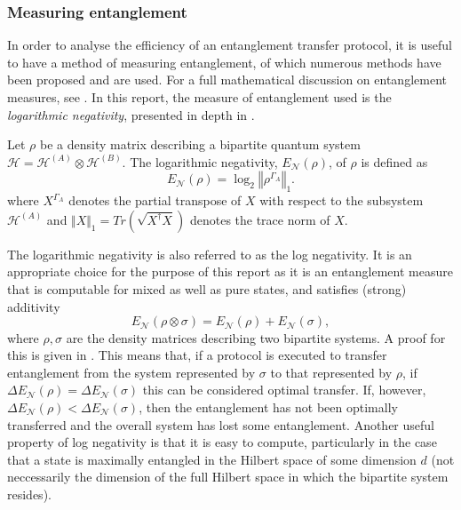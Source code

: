 \subsubsection{Measuring entanglement}
\label{subsubsection:measure_entanglement}
In order to analyse the efficiency of an entanglement transfer protocol, it is useful to have a method of measuring entanglement, of which numerous methods have been proposed and are used.
For a full mathematical discussion on entanglement measures, see \cite{Plenio_2007}.
In this report, the measure of entanglement used is the \emph{logarithmic negativity}, presented in depth in \cite{Vidal_2002}.
\begin{definition}
    \label{definition:log_neg}
    Let $\rho$ be a density matrix describing a bipartite quantum system $\mathcal{H} = \mathcal{H}^{(A)} \otimes \mathcal{H}^{(B)}$.
    The logarithmic negativity, $E_\mathcal{N}(\rho)$, of $\rho$ is defined as
    \begin{equation}
        E_\mathcal{N}(\rho) = \log_2\left\Vert \rho^{\Gamma_A}\right\Vert_1.
    \end{equation}
    where $X^{\Gamma_A}$ denotes the partial transpose of $X$ with respect to the subsystem $\mathcal{H}^{(A)}$ and $\Vert X\Vert_1 = Tr(\sqrt{X^\dagger X})$ denotes the trace norm of $X$.
\end{definition}
The logarithmic negativity is also referred to as the log negativity.
It is an appropriate choice for the purpose of this report as it is an entanglement measure that is computable for mixed as well as pure states, and satisfies (strong) additivity
\begin{equation}
    E_\mathcal{N}(\rho \otimes \sigma) = E_\mathcal{N}(\rho) + E_\mathcal{N}(\sigma),
\end{equation}
where $\rho,\sigma$ are the density matrices describing two bipartite systems.
A proof for this is given in \cite{Vidal_2002}.
This means that, if a protocol is executed to transfer entanglement from the system represented by $\sigma$ to that represented by $\rho$, if $\Delta E_{\mathcal{N}}(\rho) = \Delta E_{\mathcal{N}}(\sigma)$ this can be considered optimal transfer.
If, however,  $\Delta E_{\mathcal{N}}(\rho) < \Delta E_{\mathcal{N}}(\sigma)$, then the entanglement has not been optimally transferred and the overall system has lost some entanglement.
Another useful property of log negativity is that it is easy to compute, particularly in the case that a state is maximally entangled in the Hilbert space of some dimension $d$ (not neccessarily the dimension of the full Hilbert space in which the bipartite system resides).
